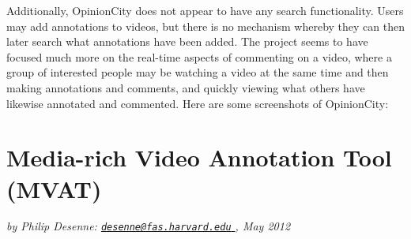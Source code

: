 Additionally, OpinionCity does not appear to have any search functionality.  Users may add annotations to videos, but there is no mechanism whereby they can then later search what annotations have been added.  The project seems to have focused much more on the real-time aspects of commenting on a video, where a group of interested people may be watching a video at the same time and then making annotations and comments, and quickly viewing what others have likewise annotated and commented.  Here are some screenshots of OpinionCity:




\section{Media-rich Video Annotation Tool (MVAT)}
\label{sec:priorwork:media-rich-video-annotation-tool}

\textit{by Philip Desenne: \href{mailto:desenne@fas.harvard.edu}{\nolinkurl{desenne@fas.harvard.edu} }, May 2012}

